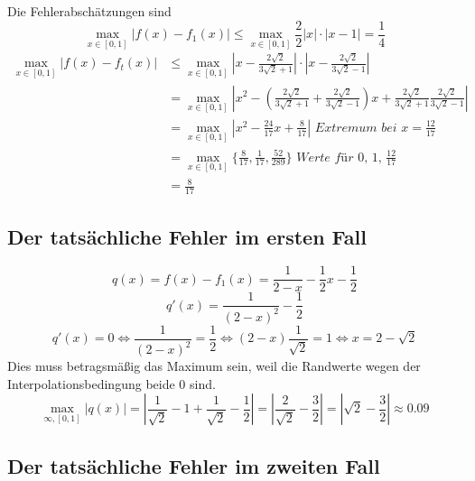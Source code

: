 \documentclass[10pt,a4paper]{article}
\begin{document}
Die Fehlerabschätzungen sind
\begin{equation}
  \max_{x \in [0, 1]} |f(x) - f_{1}(x)| \le \max_{x \in [0, 1]} \frac{2}{2} |x| \cdot |x - 1| = \frac{1}{4}
\end{equation}
\begin{align*}
  \max_{x \in [0, 1]} |f(x) - f_{t}(x)| & \le \max_{x \in [0, 1]} |x - \frac{2 \sqrt{2}}{3 \sqrt{2} + 1}| \cdot |x - \frac{2 \sqrt{2}}{3 \sqrt{2} - 1}|\\
  & = \max_{x \in [0, 1]} |x^{2} - (\frac{2 \sqrt{2}}{3 \sqrt{2} + 1} + \frac{2 \sqrt{2}}{3 \sqrt{2} - 1})x + \frac{2 \sqrt{2}}{3 \sqrt{2} + 1}\frac{2 \sqrt{2}}{3 \sqrt{2} - 1}|\\
  & = \max_{x \in [0, 1]} |x^{2} - \frac{24}{17}x + \frac{8}{17}| \textit{ Extremum bei $x = \frac{12}{17}$}\\
  & = \max_{x \in [0, 1]} \{ \frac{8}{17}, \frac{1}{17}, \frac{52}{289} \} \textit{ Werte für $0$, $1$, $\frac{12}{17}$}\\
  & = \frac{8}{17}
\end{align*}

\subsection{Der tatsächliche Fehler im ersten Fall}

\begin{equation}
  q(x) = f(x) - f_{1}(x) = \frac{1}{2 - x} - \frac{1}{2}x - \frac{1}{2}
\end{equation}
\begin{equation}
  q'(x) = \frac{1}{(2 - x)^{2}} - \frac{1}{2}
\end{equation}
\begin{equation}
  q'(x) = 0 \Leftrightarrow \frac{1}{(2 - x)^{2}} = \frac{1}{2} \Leftrightarrow (2 - x)\frac{1}{\sqrt{2}} = 1 \Leftrightarrow x = 2 - \sqrt{2}
\end{equation}
Dies muss betragsmäßig das Maximum sein, weil die Randwerte wegen der Interpolationsbedingung beide $0$ sind.
\begin{equation}
  \max_{\infty, [0, 1]} |q(x)| = |\frac{1}{\sqrt{2}} - 1 + \frac{1}{\sqrt{2}} - \frac{1}{2}| = |\frac{2}{\sqrt{2}} - \frac{3}{2}| = |\sqrt{2} - \frac{3}{2}| \approx 0.09
\end{equation}

\subsection{Der tatsächliche Fehler im zweiten Fall}
\end{document}
